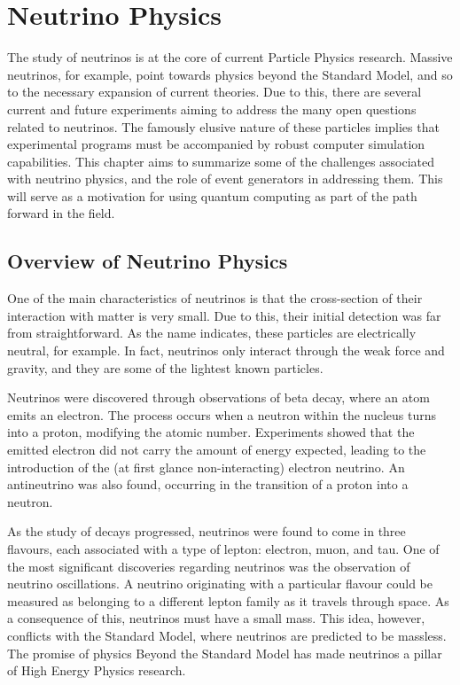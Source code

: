 
\chapter{Neutrino Physics}


The study of neutrinos is at the core of current Particle Physics research. Massive neutrinos, for example, point towards physics beyond the Standard Model, and so to the necessary expansion of current theories. Due to this, there are several current and future experiments aiming to address the many open questions related to neutrinos. The famously elusive nature of these particles implies that experimental programs must be accompanied by robust computer simulation capabilities. This chapter aims to summarize some of the challenges associated with neutrino physics, and the role of event generators in addressing them. This will serve as a motivation for using quantum computing as part of the path forward in the field.

\section{Overview of Neutrino Physics}

One of the main characteristics of neutrinos is that the cross-section of their interaction with matter is very small. Due to this, their initial detection was far from straightforward. As the name indicates, these particles are electrically neutral, for example. In fact, neutrinos only interact through the weak force and gravity, and they are some of the lightest known particles\cite{stecker,NustecWP}. 

Neutrinos were discovered through observations of beta decay, where an atom emits an electron. The process occurs when a neutron within the nucleus turns into a proton, modifying the atomic number. Experiments showed that the emitted electron did not carry the amount of energy expected, leading to the introduction of the (at first glance non-interacting) electron neutrino. An antineutrino was also found, occurring in the transition of a proton into a neutron.

As the study of decays progressed, neutrinos were found to come in three flavours, each associated with a type of lepton: electron, muon, and tau. One of the most significant discoveries regarding neutrinos was the observation of neutrino oscillations. A neutrino originating with a particular flavour could be measured as belonging to a different lepton family as it travels through space. As a consequence of this, neutrinos must have a small mass. This idea, however, conflicts with the Standard Model, where neutrinos are predicted to be massless. The promise of physics Beyond the Standard Model has made neutrinos a pillar of High Energy Physics research. 

